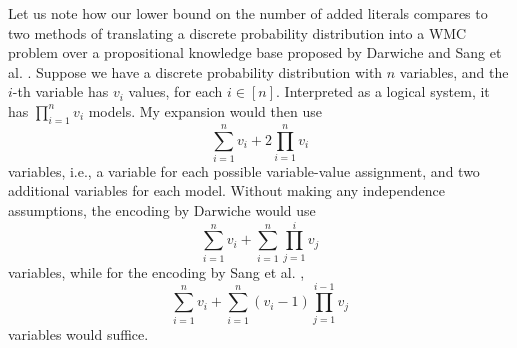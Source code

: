 \documentclass{article}
\theoremstyle{definition}
\theoremstyle{remark}
\begin{document}

Let us note how our lower bound on the number of added literals compares to two
methods of translating a discrete probability distribution into a WMC problem
over a propositional knowledge base proposed by Darwiche
\cite{DBLP:conf/kr/Darwiche02} and Sang et al. \cite{sang2005solving}. Suppose
we have a discrete probability distribution with  $n$ variables, and the $i$-th
variable has $v_i$ values, for each $i \in [n]$. Interpreted as a logical
system, it has $\prod_{i=1}^n v_i$ models. My expansion would then use
\[
  \sum_{i=1}^n v_i + 2\prod_{i=1}^n v_i
\]
variables, i.e., a variable for each possible variable-value assignment, and two
additional variables for each model. Without making any independence
assumptions, the encoding by Darwiche \cite{DBLP:conf/kr/Darwiche02} would use
\[
  \sum_{i=1}^n v_i + \sum_{i=1}^n \prod_{j=1}^i v_j
\]
variables, while for the encoding by Sang et al. \cite{sang2005solving},
\[
  \sum_{i=1}^n v_i + \sum_{i=1}^n (v_i - 1) \prod_{j=1}^{i-1} v_j
\]
variables would suffice.




\end{document}
